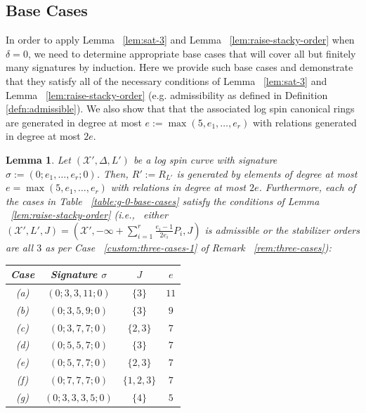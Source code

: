 \documentclass{amsart}
\theoremstyle{plain}
\newtheorem{lem}[thm]{Lemma}
\theoremstyle{definition}
\theoremstyle{remark}
\numberwithin{equation}{section}
\newcommand\ssec{\subsection}
\newcommand\sx{\mathscr X}
\newcommand \subhalf[1]{\frac{{#1} - 1}{2{#1}}}
\newcommand{\halfcan}{L}
\begin{document}
\ssec{Base Cases}
\label{ssec:g-0-base}
In order to apply Lemma ~\ref{lem:sat-3} and Lemma
~\ref{lem:raise-stacky-order} when $\delta = 0$,
we need to determine appropriate base cases that will
cover all but finitely many signatures by induction.
Here we provide such base cases and demonstrate that
they satisfy all of the necessary conditions of
Lemma ~\ref{lem:sat-3} and Lemma ~\ref{lem:raise-stacky-order}
(e.g. admissibility as defined in Definition \ref{defn:admissible}).
We also show that that the associated log spin
canonical rings are generated in degree at most $e := \max(5, e_1,
\ldots, e_r)$ with relations generated in degree at most $2e$.

\begin{lem}
\label{lem:g-0-admissible-cases}
Let $(\sx', \Delta, \halfcan')$ be a log spin curve with signature
$\sigma := (0; e_1, \ldots, e_r; 0)$. Then, $R' := R_{\halfcan'}$ is
generated by elements of degree at most $e = \max(5 , e_1, \ldots,
e_r)$ with relations in degree at most $2e$. Furthermore, each of
the cases in Table ~\ref{table:g-0-base-cases} satisfy the
conditions of Lemma ~\ref{lem:raise-stacky-order} (i.e.,~ either $(\sx',
\halfcan', J) = (\sx', -\infty + \sum_{i = 1}^{r} \subhalf{e_i}
P_i, J)$ is admissible or the stabilizer orders are all $3$ as per
Case ~\ref{custom:three-cases-1} of Remark ~\ref{rem:three-cases}):
 
\rm{
\begin{table}
\begin{tabular}
	{| c || c | c | c |}
	\hline
	Case & Signature $\sigma$ & $J$ & $e$\\
	\hline
	\hline

	(a) & $(0; 3, 3, 11; 0)$ & $\{3\}$ & $11$ \\	\hline

	(b) & $(0; 3, 5, 9; 0)$ & $\{3\}$	& $9$ \\ \hline

	(c) & $(0; 3, 7, 7; 0)$ & $\{2, 3\}$ & $7$ \\ \hline

	(d) & $(0; 5, 5, 7; 0)$ & $\{3\}$	& $7$ \\ \hline
	
	(e) & $(0; 5, 7, 7; 0)$ & $\{2, 3\}$ & $7$ \\ \hline
	
	(f) & $(0; 7, 7, 7; 0)$ & $\{1, 2, 3\}$	& $7$ \\ \hline

	(g) & $(0; 3, 3, 3, 5; 0)$ & $\{4\}$ & $5$ \\ \hline
	

\end{tabular}
\end{table}}
\end{lem}
\end{document}
